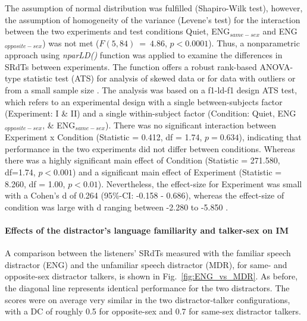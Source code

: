 \documentclass[a4paper, twoside]{templates/ociamthesis}
\begin{document}
The assumption of normal distribution was fulfilled (Shapiro-Wilk test), however, the assumption of homogeneity of the variance (Levene's test) for the interaction between the two experiments and test conditions Quiet, ENG\(_{same-sex}\) and ENG\(_{ opposite-sex}\)) was not met (\(F(5,84)~=~4.86\), \(p < 0.0001\)). Thus, a nonparametric approach using \textit{nparLD()} function \autocite[nparLD package;][]{nparLDPackageR} was applied to examine the differences in SRdTs between experiments. The function offers a robust rank-based ANOVA-type statistic test (ATS) for analysis of skewed data or for data with outliers or from a small sample size \autocite[see][for a good introduction on robust nonparametric techniques]{Feys2016}. The analysis was based on a f1-ld-f1 design ATS test, which refers to an experimental design with a single between-subjects factor (Experiment: I \& II) and a single within-subject factor (Condition: Quiet, ENG\(_{opposite-sex}\), \& ENG\(_{same-sex}\)). There was no significant interaction between Experiment x Condition (Statistic = 0.412, df = 1.74, \(p = 0.634\)), indicating that performance in the two experiments did not differ between conditions. Whereas there was a highly significant main effect of Condition (Statistic = 271.580, df=1.74, \(p < 0.001\)) and a significant main effect of Experiment (Statistic = 8.260, df = 1.00, \(p < 0.01\)). Nevertheless, the effect-size for Experiment was small with a Cohen's d of 0.264 (95\%-CI: -0.158 - 0.686), whereas the effect-size of condition was large with d ranging between -2.280 to -5.850 \autocite[\textit{effsize::cohen.d()};][]{effsizeRPackage}.\\

\hypertarget{effects-of-the-distractors-language-familiarity-and-talker-sex-on-im}{%
\paragraph{Effects of the distractor's language familiarity and talker-sex on IM}\label{effects-of-the-distractors-language-familiarity-and-talker-sex-on-im}}

A comparison between the listeners' SRdTs measured with the familiar speech distractor (ENG) and the unfamiliar speech distractor (MDR), for same- and opposite-sex distractor talkers, is shown in Fig.~\ref{fig:ENG_vs_MDR}. As before, the diagonal line represents identical performance for the two distractors. The scores were on average very similar in the two distractor-talker configurations, with a DC of roughly 0.5 for opposite-sex and 0.7 for same-sex distractor talkers.\\
\end{document}
